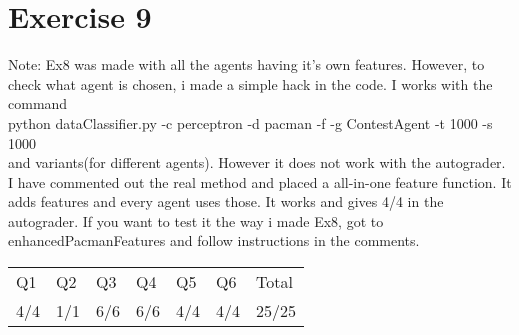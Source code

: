 \section{Exercise 9}
Note: Ex8 was made with all the agents having it's own features. However, to check what agent is chosen, i made a simple hack in the code. I works with the command \\ python dataClassifier.py -c perceptron -d pacman -f -g ContestAgent -t 1000 -s 1000 \\ and variants(for different agents). However it does not work with the autograder. I have commented out the real method and placed a all-in-one feature function. It adds features and every agent uses those. It works and gives 4/4 in the autograder. If you want to test it the way i made Ex8, got to enhancedPacmanFeatures and follow instructions in the comments.
\\
\begin{table}[!htbp]
\centering
\begin{tabular}{lllllll}
\hline
Q1  & Q2  & Q3  & Q4  & Q5  & Q6  & Total \\
4/4 & 1/1 & 6/6 & 6/6 & 4/4 & 4/4 & 25/25
\end{tabular}
\end{table}
